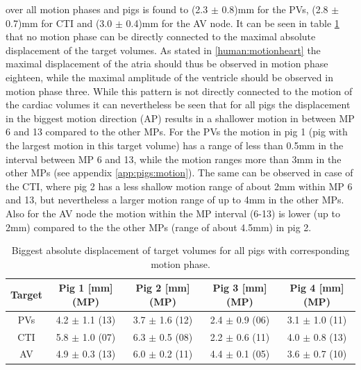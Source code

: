 over all motion phases and pigs is found to (2.3 $\pm$ 0.8)mm for the PVs, (2.8 $\pm$ 0.7)mm for CTI and (3.0 $\pm$ 0.4)mm for the AV node.\newline
\newline
It can be seen in table \ref{tab:maxabsmotion_allpigs} that no motion phase can be directly connected to the maximal absolute 
displacement of the target volumes. As stated in \ref{human:motionheart} the maximal displacement of the atria should thus be observed in 
motion phase eighteen, while the maximal amplitude of the ventricle should be observed in motion phase three. 
While this pattern is not directly connected to the motion of the cardiac volumes it can nevertheless be seen that for all pigs the 
displacement in the biggest motion direction (AP) results in a shallower motion in between MP 6 and 13 compared to the other MPs. 
For the PVs the motion in pig 1 (pig with the largest motion in this target volume) has a range of less than 0.5mm in the interval between MP 
6 and 13, while the motion ranges more than 3mm in the other MPs (see appendix \ref{app:pigs:motion}). The same can be observed in case of the 
CTI, where pig 2 has a less shallow motion range of about 2mm within MP 6 and 13, but nevertheless a larger motion range of up to 4mm in the 
other MPs. Also for the AV node the motion within the MP interval (6-13) is lower (up to 2mm) compared to the the other MPs (range of about 
4.5mm) in pig 2. 

\vspace*{0.8cm}

\begin{table}[H]
  \centering
  \caption{Biggest absolute displacement of target volumes for all pigs with corresponding motion phase.}
  \begin{tabular}{|c|c|c|c|c|}
    \hline\hline
    Target & Pig 1 [mm] (MP) & Pig 2 [mm] (MP) & Pig 3 [mm] (MP) & Pig 4 [mm] (MP) \\
    \hline
    PVs & 4.2 $\pm$ 1.1 (13) & 3.7 $\pm$ 1.6 (12) & 2.4 $\pm$ 0.9 (06) & 3.1 $\pm$ 1.0 (11) \\
    CTI & 5.8 $\pm$ 1.0 (07) & 6.3 $\pm$ 0.5 (08) & 2.2 $\pm$ 0.6 (11) & 4.0 $\pm$ 0.8 (13) \\
    AV & 4.9 $\pm$ 0.3 (13) & 6.0 $\pm$ 0.2 (11) & 4.4 $\pm$ 0.1 (05)  & 3.6 $\pm$ 0.7 (10) \\
    \hline\hline
  \end{tabular}
  \label{tab:maxabsmotion_allpigs}
\end{table}



